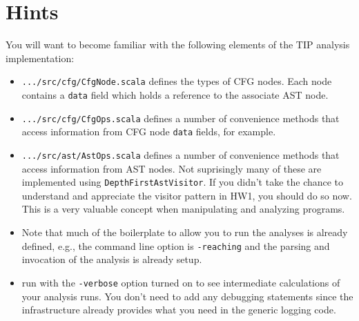 \documentclass[12pt,letterpaper]{article}
\begin{document}
\section*{Hints}
You will want to become familiar with the following elements of the TIP analysis implementation:
\begin{itemize}
\item \texttt{.../src/cfg/CfgNode.scala} defines the types of CFG nodes.  Each node contains a \texttt{data} field which holds a reference to the associate AST node.
\item \texttt{.../src/cfg/CfgOps.scala} defines a number of convenience methods that access information from CFG node \texttt{data} fields, for example.
\item \texttt{.../src/ast/AstOps.scala} defines a number of convenience methods that access information from AST nodes.  Not suprisingly many of these are implemented using \texttt{DepthFirstAstVisitor}.  If you didn't take the chance to understand and appreciate the visitor pattern in HW1, you should do so now.  This is a very valuable concept when manipulating and analyzing programs.
\item Note that much of the boilerplate to allow you to run the analyses is already defined, e.g., the command line option is \texttt{-reaching} and the parsing and invocation of the analysis is already setup.
\item run with the \texttt{-verbose} option turned on to see intermediate calculations of your analysis runs.  You don't need to add any debugging statements since the infrastructure already provides what you need in the generic logging code.
\end{itemize}
\end{document}
